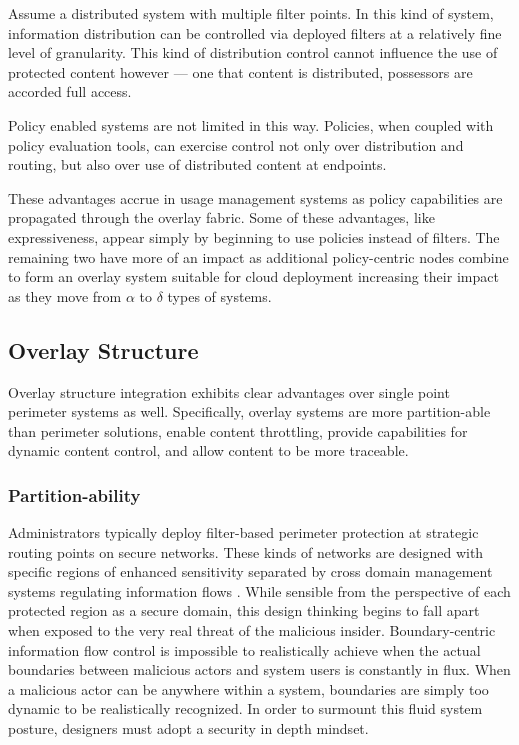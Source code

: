 Assume a distributed system with multiple filter points.  In this kind of system, information distribution can be controlled via deployed filters at a relatively fine level of granularity.  This kind of distribution control cannot influence the use of protected content however --- one that content is distributed, possessors are accorded full access.

Policy enabled systems are not limited in this way.  Policies, when coupled with policy evaluation tools, can exercise control not only over distribution and routing, but also over use of distributed content at endpoints.

These advantages accrue in usage management systems as policy capabilities are propagated through the overlay fabric.  Some of these advantages, like expressiveness, appear simply by beginning to use policies instead of filters.  The remaining two have more of an impact as additional policy-centric nodes combine to form an overlay system suitable for cloud deployment increasing their impact as they move from $\alpha$ to $\delta$ types of systems.

\subsection{Overlay Structure}
Overlay structure integration exhibits clear advantages over single point perimeter systems as well.  Specifically, overlay systems are more partition-able than perimeter solutions, enable content throttling, provide capabilities for dynamic content control, and allow content to be more traceable.

\subsubsection*{Partition-ability}
Administrators typically deploy filter-based perimeter protection at strategic routing points on secure networks.  These kinds of networks are designed with specific regions of enhanced sensitivity separated by cross domain management systems regulating information flows \cite{proposal:nsa-arch,proposal:raytheon-arch,proposal:bah-arch}.  While sensible from the perspective of each protected region as a secure domain, this design thinking begins to fall apart when exposed to the very real threat of the malicious insider.  Boundary-centric information flow control is impossible to realistically achieve when the actual boundaries between malicious actors and system users is constantly in flux.  When a malicious actor can be anywhere within a system, boundaries are simply too dynamic to be realistically recognized.  In order to surmount this fluid system posture, designers must adopt a security in depth mindset.

